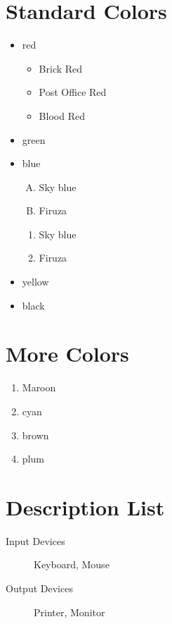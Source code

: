 \documentclass{article}
\begin{document}
	\renewcommand{\labelitemi}{$\diamond$}
	\renewcommand{\labelitemii}{$\blacksquare$}
	\section{Standard Colors}
	\begin{itemize}
		\item red
		\begin{itemize}
			\item Brick Red
			\item Post Office Red
			\item Blood Red
		\end{itemize}
		\item green
		\item blue
		\begin{enumerate}[(A)]
			\item Sky blue
			\item Firuza
		\end{enumerate}
		\begin{enumerate}[(i.)]
			\item Sky blue
			\item Firuza
		\end{enumerate}
		\item yellow
		\item black
	\end{itemize}
	\section{More Colors}
	\begin{enumerate}
		\item Maroon
		\item cyan
		\item brown
		\item plum
	\end{enumerate}
	\section{Description List}
	\begin{description}
		\item[Input Devices] Keyboard, Mouse
		\item[Output Devices] Printer, Monitor
	\end{description}
\end{document}
